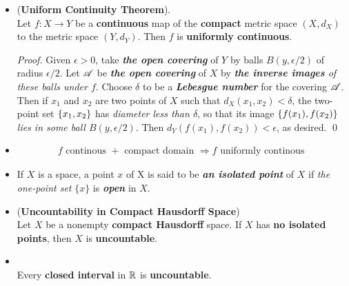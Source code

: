 \documentclass[11pt]{article}
\begin{document}
\begin{itemize}
\item \begin{theorem} (\textbf{Uniform Continuity Theorem}). \citep{munkres2000topology} \\
 Let $f: X \rightarrow Y$ be a \textbf{continuous} map of the \textbf{compact} metric space $(X, d_X) $ to the metric space $(Y, d_Y)$. Then $f$ is \textbf{uniformly continuous}.
\end{theorem}
\begin{proof}
Given $\epsilon > 0$, take \emph{\textbf{the open covering}} of $Y$ by balls $B(y, \epsilon/2)$ of radius $\epsilon/2$. Let ${\mathscr A}$ be \emph{\textbf{the open covering}} of $X$ by \emph{\textbf{the inverse images} of these balls under $f$}. Choose $\delta$ to be a \emph{\textbf{Lebesgue number}} for the covering ${\mathscr A}$. Then if $x_1$ and $x_2$ are two points of $X$ such that $d_X(x_1, x_2) < \delta$, the two-point set $\left\{x_1, x_2\right\}$ has \emph{diameter less than $\delta$}, so that
its image $\left\{f(x_1), f(x_2)\right\}$ \emph{lies in some ball $B(y, \epsilon/2)$}. Then $d_Y(f(x_1), f(x_2)) < \epsilon$, as
desired.  \qed
\end{proof}

\item \begin{remark}
\begin{align*}
f\text{ continous } + \text{ compact domain } \Rightarrow f\text{ uniformly continous }
\end{align*}
\end{remark}

\item \begin{definition}
If $X$ is a space, a point $x$ of X is said to be \emph{\textbf{an isolated point}} of $X$ if \emph{the one-point set} $\{x\}$ is \emph{\textbf{open}} in $X$.
\end{definition}

\item \begin{theorem} (\textbf{Uncountability in Compact Hausdorff Space}) \citep{munkres2000topology}\\
Let $X$ be a nonempty \textbf{compact Hausdorff} space. If $X$ has \textbf{no isolated points}, then $X$ is \textbf{uncountable}.
\end{theorem}


\item \begin{corollary} \citep{munkres2000topology}\\
Every \textbf{closed interval} in ${\mathbb R}$ is \textbf{uncountable}.
\end{corollary}


\end{itemize}
\end{document}
